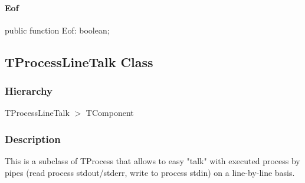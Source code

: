 \documentclass{report}
\newif\ifpdf
\begin{document}
\paragraph*{Eof}\hspace*{\fill}

\label{PasDoc_ProcessLineTalk.TTextReader-Eof}
\begin{list}{}{
\setlength{\itemindent}{0cm}
\setlength{\listparindent}{0cm}
\setlength{\leftmargin}{\evensidemargin}
\addtolength{\leftmargin}{\tmplength}
\settowidth{\labelsep}{X}
\addtolength{\leftmargin}{\labelsep}
\setlength{\labelwidth}{\tmplength}
}
\item[\textbf{Declaration}\hfill]
\ifpdf
\begin{flushleft}
\fi
\begin{ttfamily}
public function Eof: boolean;\end{ttfamily}

\ifpdf
\end{flushleft}
\fi

\end{list}
\ifpdf
\subsection*{\large{\textbf{TProcessLineTalk Class}}\normalsize\hspace{1ex}\hrulefill}
\else
\subsection*{TProcessLineTalk Class}
\fi
\label{PasDoc_ProcessLineTalk.TProcessLineTalk}
\subsubsection*{\large{\textbf{Hierarchy}}\normalsize\hspace{1ex}\hfill}
TProcessLineTalk {$>$} TComponent
\subsubsection*{\large{\textbf{Description}}\normalsize\hspace{1ex}\hfill}
This is a subclass of TProcess that allows to easy "talk" with executed process by pipes (read process stdout/stderr, write to process stdin) on a line{-}by{-}line basis.
\end{document}
